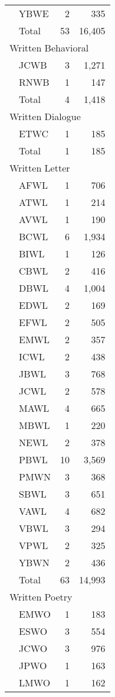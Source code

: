 \begin{longtable}{llrr}
		& YBWE & 2 & 335\\\addlinespace
		& Total & 53 &  16,405\\\midrule
		\multicolumn{4}{l}{Written Behavioral}\\
		& JCWB & 3 & 1,271\\
		& RNWB & 1 & 147\\\addlinespace
		& Total & 4 &  1,418\\\midrule
		\multicolumn{4}{l}{Written Dialogue}\\
		& ETWC & 1 & 185\\\addlinespace
		& Total &  1 & 185\\\midrule
		\multicolumn{4}{l}{Written Letter}\\
		& AFWL & 1 & 706\\
		& ATWL & 1 & 214\\
		& AVWL & 1 & 190\\
		& BCWL & 6 & 1,934\\
		& BIWL & 1 & 126\\
		& CBWL & 2 & 416\\
		& DBWL & 4 & 1,004\\
		& EDWL & 2 & 169\\
		& EFWL & 2 & 505\\
		& EMWL & 2 & 357\\
		& ICWL & 2 & 438\\
		& JBWL & 3 & 768\\
		& JCWL & 2 & 578\\
		& MAWL & 4 & 665\\
		& MBWL & 1 & 220\\
		& NEWL & 2 & 378\\
		& PBWL & 10 & 3,569\\
		& PMWN & 3 & 368\\
		& SBWL & 3 & 651\\
		& VAWL & 4 & 682\\
		& VBWL & 3 & 294\\
		& VPWL & 2 & 325\\
		& YBWN & 2 & 436\\\addlinespace
		& Total & 63 &  14,993\\\midrule
		\multicolumn{4}{l}{Written Poetry}\\
		& EMWO & 1 & 183\\
		& ESWO & 3 & 554\\
		& JCWO & 3 & 976\\
		& JPWO & 1 & 163\\
		& LMWO & 1 & 162\\

\end{longtable}
